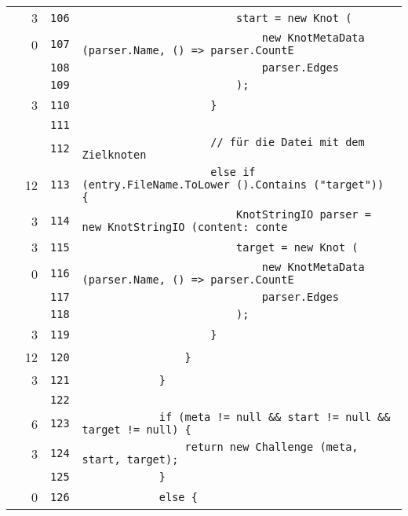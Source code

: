 \documentclass[a4paper,10pt]{article}
\begin{document}
\begin{longtable}[l]{lrrl}
\cellcolor{green} & 3 & \verb~106~ & \verb~                        start = new Knot (~\\
\cellcolor{red} & 0 & \verb~107~ & \verb~                            new KnotMetaData (parser.Name, () => parser.CountE~\\
\cellcolor{gray} &  & \verb~108~ & \verb~                            parser.Edges~\\
\cellcolor{gray} &  & \verb~109~ & \verb~                        );~\\
\cellcolor{green} & 3 & \verb~110~ & \verb~                    }~\\
\cellcolor{gray} &  & \verb~111~ & \verb~~\\
\cellcolor{gray} &  & \verb~112~ & \verb~                    // für die Datei mit dem Zielknoten~\\
\cellcolor{green} & 12 & \verb~113~ & \verb~                    else if (entry.FileName.ToLower ().Contains ("target")) {~\\
\cellcolor{green} & 3 & \verb~114~ & \verb~                        KnotStringIO parser = new KnotStringIO (content: conte~\\
\cellcolor{green} & 3 & \verb~115~ & \verb~                        target = new Knot (~\\
\cellcolor{red} & 0 & \verb~116~ & \verb~                            new KnotMetaData (parser.Name, () => parser.CountE~\\
\cellcolor{gray} &  & \verb~117~ & \verb~                            parser.Edges~\\
\cellcolor{gray} &  & \verb~118~ & \verb~                        );~\\
\cellcolor{green} & 3 & \verb~119~ & \verb~                    }~\\
\cellcolor{green} & 12 & \verb~120~ & \verb~                }~\\
\cellcolor{green} & 3 & \verb~121~ & \verb~            }~\\
\cellcolor{gray} &  & \verb~122~ & \verb~~\\
\cellcolor{green} & 6 & \verb~123~ & \verb~            if (meta != null && start != null && target != null) {~\\
\cellcolor{green} & 3 & \verb~124~ & \verb~                return new Challenge (meta, start, target);~\\
\cellcolor{gray} &  & \verb~125~ & \verb~            }~\\
\cellcolor{red} & 0 & \verb~126~ & \verb~            else {~\\

\end{longtable}
\end{document}

